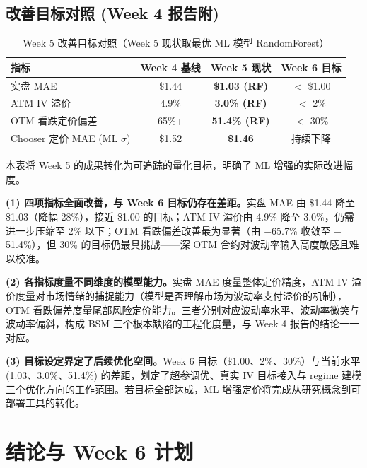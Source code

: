 \documentclass[a4paper,11pt]{article}
\begin{document}
\subsection{改善目标对照 (Week 4 报告附)}

\begin{table}[H]
\centering
\caption{Week 5 改善目标对照（Week 5 现状取最优 ML 模型 RandomForest）}
\label{tab:targets}
\begin{tabular}{lccc}
\toprule
\textbf{指标} & \textbf{Week 4 基线} & \textbf{Week 5 现状} & \textbf{Week 6 目标} \\
\midrule
实盘 MAE & \$1.44 & \textbf{\$1.03 (RF)} & $<$ \$1.00 \\
ATM IV 溢价 & 4.9\% & \textbf{3.0\% (RF)} & $<$ 2\% \\
OTM 看跌定价偏差 & 65\%+ & \textbf{51.4\% (RF)} & $<$ 30\% \\
Chooser 定价 MAE (ML $\sigma$) & \$1.52 & \textbf{\$1.46} & 持续下降 \\
\bottomrule
\end{tabular}
\end{table}

本表将 Week 5 的成果转化为可追踪的量化目标，明确了 ML 增强的实际改进幅度。

\vspace{0.3cm}
\textbf{(1) 四项指标全面改善，与 Week 6 目标仍存在差距。}实盘 MAE 由 \$1.44 降至 \$1.03（降幅 28\%），接近 \$1.00 的目标；ATM IV 溢价由 4.9\% 降至 3.0\%，仍需进一步压缩至 2\% 以下；OTM 看跌偏差改善最为显著（由 $-$65.7\% 收敛至 $-$51.4\%），但 30\% 的目标仍最具挑战——深 OTM 合约对波动率输入高度敏感且难以校准。

\vspace{0.3cm}
\textbf{(2) 各指标度量不同维度的模型能力。}实盘 MAE 度量整体定价精度，ATM IV 溢价度量对市场情绪的捕捉能力（模型是否理解市场为波动率支付溢价的机制），OTM 看跌偏差度量尾部风险定价能力。三者分别对应波动率水平、波动率微笑与波动率偏斜，构成 BSM 三个根本缺陷的工程化度量，与 Week 4 报告的结论一一对应。

\vspace{0.3cm}
\textbf{(3) 目标设定界定了后续优化空间。}Week 6 目标（$\$1.00$、2\%、30\%）与当前水平 (1.03、3.0\%、51.4\%) 的差距，划定了超参调优、真实 IV 目标接入与 regime 建模三个优化方向的工作范围。若目标全部达成，ML 增强定价将完成从研究概念到可部署工具的转化。

\section{结论与 Week 6 计划}
\end{document}
